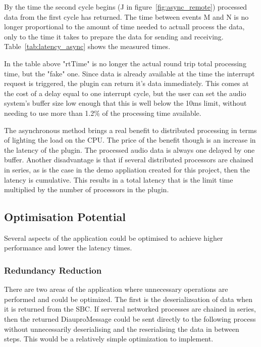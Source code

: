 By the time the second cycle begins (J in figure~\ref{fig:async_remote}) processed data from the first cycle has returned. The time between events M and N is no longer proportional to the amount of time needed to actuall process the data, only to the time it takes to prepare the data for sending and receiving. Table~\ref{tab:latency_async} shows the measured times.



In the table above "rtTime" is no longer the actual round trip total processing time, but the "fake" one. Since data is already available at the time the interrupt request is triggered, the plugin can return it's data immediately. This comes at the cost of a delay equal to one interrupt cycle, but the user can set the audio system's buffer size low enough that this is well below the 10ms limit, without needing to use more than 1.2\% of the processing time available.

The asynchronous method brings a real benefit to distributed processing in terms of lighting the load on the CPU. The price of the benefit though is an increase in the latency of the plugin. The processed audio data is always one delayed by one buffer. Another disadvantage is that if several distributed processors are chained in series, as is the case in the demo appliation created for this project, then the latency is cumulative. This results in a total latency that is the limit time multiplied by the number of processors in the plugin.

\subsection{Optimisation Potential}

Several aspects of the application could be optimised to achieve higher performance and lower the latency times.

\subsubsection{Redundancy Reduction}

There are two areas of the application where unnecessary operations are performed and could be optimized. The first is the deserializsation of data when it is returned from the SBC. If serveral networked processes are chained in series, then the returned DiauproMessage could be sent directly to the following process without unnecessarily deserialising and the reserialising the data in between steps. This would be a relatively simple optimization to implement.

